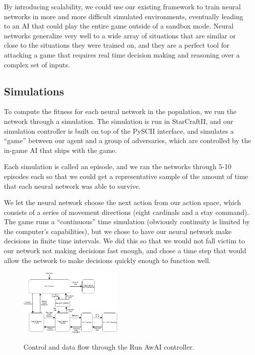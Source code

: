 \documentclass{article}
\begin{document}
\begin{multicols}{2}
By introducing scalability, we could use our existing framework to train neural
networks in more and more difficult simulated environments, eventually leading
to an AI that could play the entire game outside of a sandbox mode. Neural
networks generalize very well to a wide array of situations that are similar or
close to the situations they were trained on, and they are a perfect tool for
attacking a game that requires real time decision making and reasoning over a
complex set of inputs.

\subsection{Simulations}
To compute the fitness for each neural network in the population, we run the
network through a simulation. The simulation is run in StarCraftII, and our
simulation controller is built on top of the PySCII interface, and simulates
a ``game'' between our agent and a group of adversaries, which are controlled by
the in-game AI that ships with the game.

Each simulation is called an episode, and we ran the networks through 5-10
episodes each so that we could get a representative sample of the amount of time
that each neural network was able to survive.

We let the neural network choose the next action from our action space, which
consists of a series of movement directions (eight cardinals and a stay
command). The game runs a ``continuous'' time simulation (obviously continuity
is limited by the computer's capabilities), but we chose to have our neural
network make decisions in finite time intervals. We did this so that we would
not fall victim to our network not making decisions fast enough, and chose a
time step that would allow the network to make decisions quickly enough to
function well.

\begin{figure}[H]
\centering
\includegraphics[width=0.45\textwidth]{chart}\label{fig:flow chart}
\begin{changemargin}{0.15in}{0.15in}
  \caption{Control and data flow through the Run AwAI controller.}
\end{changemargin}
\end{figure}


\end{multicols}
\end{document}
